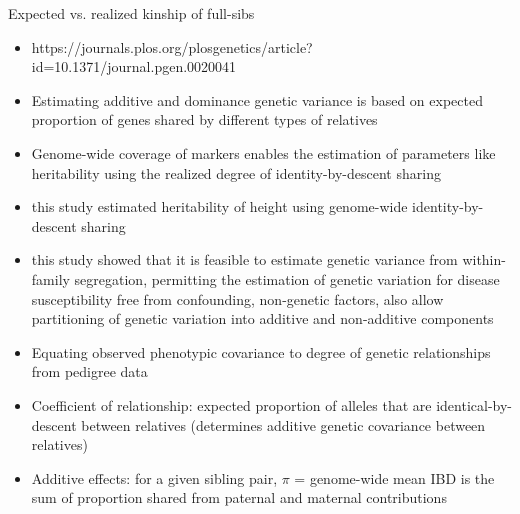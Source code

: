\documentclass[12pt]{amsart}
\begin{document}
{\large Expected vs. realized kinship of full-sibs}
\begin{itemize}
\item https://journals.plos.org/plosgenetics/article?id=10.1371/journal.pgen.0020041
\item Estimating additive and dominance genetic variance is based on expected proportion of genes shared by different types of relatives
\item Genome-wide coverage of markers enables the estimation of parameters like heritability using the realized degree of identity-by-descent sharing
\item this study estimated heritability of height using genome-wide identity-by-descent sharing 
\item this study showed that it is feasible to estimate genetic variance from within-family segregation, permitting the estimation of genetic variation for disease susceptibility free from confounding, non-genetic factors, also allow partitioning of genetic variation into additive and non-additive components
\item Equating observed phenotypic covariance to degree of genetic relationships from pedigree data
\item Coefficient of relationship: expected proportion of alleles that are identical-by-descent between relatives (determines additive genetic covariance between relatives)
\item Additive effects: for a given sibling pair, $\pi$ = genome-wide mean IBD is the sum of proportion shared from paternal and maternal contributions
\end{itemize}
\end{document}
